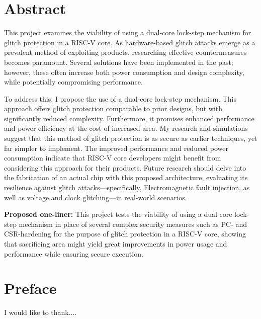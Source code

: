 \chapter{Abstract}
This project examines the viability of using a dual-core lock-step mechanism for glitch protection in a RISC-V core. As hardware-based glitch attacks emerge as a prevalent method of exploiting products, researching effective countermeasures becomes paramount. Several solutions have been implemented in the past; however, these often increase both power consumption and design complexity, while potentially compromising performance.

To address this, I propose the use of a dual-core lock-step mechanism. This approach offers glitch protection comparable to prior designs, but with significantly reduced complexity. Furthermore, it promises enhanced performance and power efficiency at the cost of increased area. My research and simulations suggest that this method of glitch protection is as secure as earlier techniques, yet far simpler to implement. The improved performance and reduced power consumption indicate that RISC-V core developers might benefit from considering this approach for their products. Future research should delve into the fabrication of an actual chip with this proposed architecture, evaluating its resilience against glitch attacks—specifically, Electromagnetic fault injection, as well as voltage and clock glitching—in real-world scenarios. 

\textbf{Proposed one-liner: }
This project tests the viability of using a dual core lock-step mechanism in place of several complex security measures such as PC- and CSR-hardening for the purpose of glitch protection in a RISC-V core, showing that sacrificing area might yield great improvements in power usage and performance while ensuring secure execution.

\chapter{Preface}
I would like to thank....

